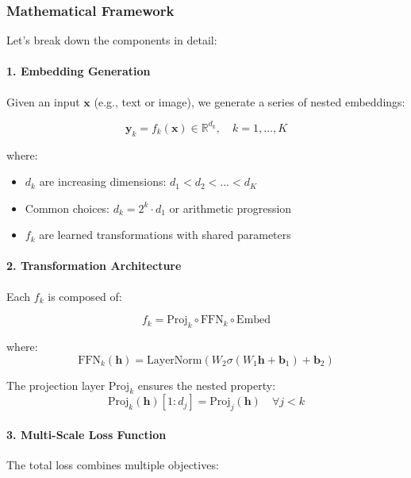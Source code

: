 \subsubsection{Mathematical Framework}

Let's break down the components in detail:

\paragraph{1. Embedding Generation}
Given an input $\mathbf{x}$ (e.g., text or image), we generate a series of nested embeddings:

\begin{equation}
    \mathbf{y}_k = f_k(\mathbf{x}) \in \mathbb{R}^{d_k}, \quad k = 1,\ldots,K
\end{equation}

where:
\begin{itemize}
    \item $d_k$ are increasing dimensions: $d_1 < d_2 < ... < d_K$
    \item Common choices: $d_k = 2^k \cdot d_1$ or arithmetic progression
    \item $f_k$ are learned transformations with shared parameters
\end{itemize}

\paragraph{2. Transformation Architecture}
Each $f_k$ is composed of:

\begin{equation}
    f_k = \text{Proj}_k \circ \text{FFN}_k \circ \text{Embed}
\end{equation}

where:
\begin{equation}
    \text{FFN}_k(\mathbf{h}) = \text{LayerNorm}(W_2\sigma(W_1\mathbf{h} + \mathbf{b}_1) + \mathbf{b}_2)
\end{equation}

The projection layer $\text{Proj}_k$ ensures the nested property:
\begin{equation}
    \text{Proj}_k(\mathbf{h})[1:d_j] = \text{Proj}_j(\mathbf{h}) \quad \forall j < k
\end{equation}

\paragraph{3. Multi-Scale Loss Function}
The total loss combines multiple objectives:

